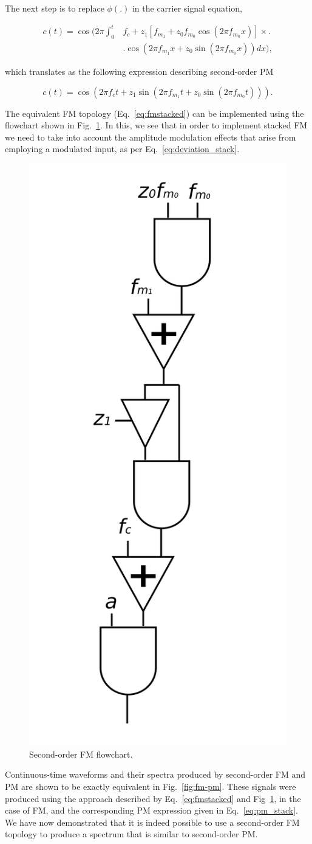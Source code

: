 \documentclass[]{interact}
\begin{document}
The next step is to replace $\phi(.)$  in the carrier signal 
equation,

\begin{equation}
\begin{split}
c(t) = \cos\Bigg(2\pi \int_{0}^{t} &f_c  + z_1 [f_{m_1} + z_0 f_{m_0} \cos(2\pi f_{m_0}x)] \times\Bigg.\\
&\Bigg. \cos\left(2\pi f_{m_1} x + z_0\sin(2\pi f_{m_0}x)\right) dx\Bigg),
\end{split}
\end{equation}

\noindent which translates as the following expression describing second-order PM

\begin{equation}\label{eq:pm_stack}
c(t) = \cos\left(2\pi f_c t + z_1\sin\left(2\pi f_{m_1} t + z_0\sin(2\pi f_{m_0} t)\right) \right).
\end{equation}

The equivalent FM topology (Eq.~\ref{eq:fmstacked}) can be implemented 
using the flowchart shown in Fig.~\ref{fig:stacked}. In this, we see that in order to 
implement stacked FM we need to take into account the amplitude modulation effects that arise
from employing a modulated input, as per Eq.~\ref{eq:deviation_stack}.

\begin{figure}[htp]
\begin{center}
\includegraphics[width=.3\columnwidth]{stacked.png}
\caption{Second-order FM flowchart.}
\label{fig:stacked}
\end{center}
\end{figure} 

Continuous-time waveforms and their spectra produced by second-order FM and PM are shown
to be exactly equivalent in Fig.~\ref{fig:fm-pm}. These signals were produced using the approach
described by Eq.~\ref{eq:fmstacked} and Fig~\ref{fig:stacked}, in the case of FM, and the
corresponding PM expression given in Eq.~\ref{eq:pm_stack}. We have now demonstrated that it 
is indeed possible to use a second-order FM topology to produce a spectrum that is similar 
to second-order PM.  
\end{document}
